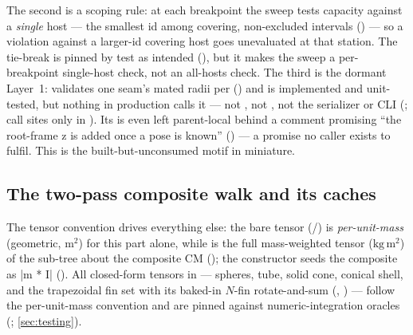 The second is a scoping rule: at each breakpoint the sweep tests capacity against a \emph{single}
host --- the smallest id among covering, non-excluded intervals
() --- so a violation against a larger-id covering host goes
unevaluated at that station. The tie-break is pinned by test as intended
(), but it makes the sweep a per-breakpoint
single-host check, not an all-hosts check. The third is the dormant Layer~1:
 validates one seam's mated radii per 
() and is implemented and unit-tested, but nothing in
production calls it --- not , not , not the
serializer or CLI (; call sites only in
). Its  is even left parent-local behind
a comment promising ``the root-frame z is added once a pose is known''
() --- a promise no caller exists to fulfil. This is the
built-but-unconsumed motif in miniature.

\subsection{The two-pass composite walk and its caches}\label{sec:model-composite}

The tensor convention drives everything else: the bare tensor (/) is
\emph{per-unit-mass} (geometric, $\mathrm{m^2}$) for this part alone, while 
is the full mass-weighted tensor ($\mathrm{kg\,m^2}$) of the sub-tree about the composite CM
(); the constructor seeds the composite as \cppinline|m * I|
(). All closed-form tensors in  ---
spheres, tube, solid cone, conical shell, and the trapezoidal fin set with its baked-in $N$-fin
rotate-and-sum (, ) --- follow the
per-unit-mass convention and are pinned against numeric-integration oracles
(; \cref{sec:testing}).

